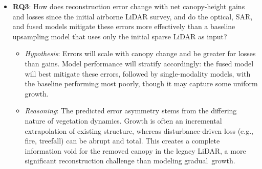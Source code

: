 \documentclass[remotesensing,article,accept,pdftex,moreauthors]{Definitions/mdpi}
\begin{document}
\begin{itemize}
  \item \textbf{RQ3}: How does reconstruction error change with net canopy-height gains and losses since the initial airborne LiDAR survey, and do the optical, SAR, and fused models mitigate these errors more effectively than a baseline upsampling model that uses only the initial sparse LiDAR as input?
        \begin{itemize}
            \item \textit{Hypothesis}: Errors will scale with canopy change and be greater for losses than gains. Model performance will stratify accordingly: the fused model will best mitigate these errors, followed by single-modality models, with the baseline performing most poorly, though it may capture some uniform growth.
            \item \textit{Reasoning}: The predicted error asymmetry stems from the differing nature of vegetation dynamics. Growth is often an incremental extrapolation of existing structure, whereas disturbance-driven loss (e.g., fire, treefall) can be abrupt and total. This creates a complete information void for the removed canopy in the legacy LiDAR, a more significant reconstruction challenge than modeling \mbox{gradual growth}.
        \end{itemize}
\end{itemize}





\section{ %
}

\end{document}
